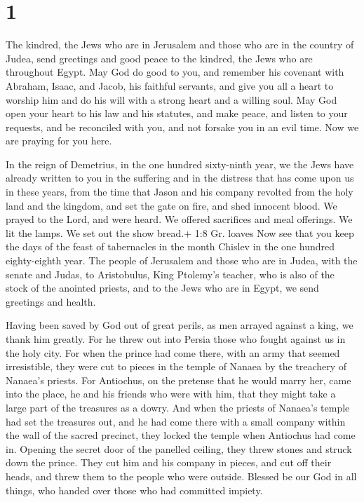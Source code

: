 \hypertarget{section}{%
\section{1}\label{section}}

 The kindred, the Jews who are in Jerusalem and those who
are in the country of Judea, send greetings and good peace to the
kindred, the Jews who are throughout Egypt.  May God do good
to you, and remember his covenant with Abraham, Isaac, and Jacob, his
faithful servants,  and give you all a heart to worship him
and do his will with a strong heart and a willing soul.  May
God open your heart to his law and his statutes, and make peace,
 and listen to your requests, and be reconciled with you,
and not forsake you in an evil time.  Now we are praying for
you here.

 In the reign of Demetrius, in the one hundred sixty-ninth
year, we the Jews have already written to you in the suffering and in
the distress that has come upon us in these years, from the time that
Jason and his company revolted from the holy land and the kingdom,
 and set the gate on fire, and shed innocent blood. We
prayed to the Lord, and were heard. We offered sacrifices and meal
offerings. We lit the lamps. We set out the show bread.+ 1:8 Gr. loaves
 Now see that you keep the days of the feast of tabernacles
in the month Chislev in the one hundred eighty-eighth year.
 The people of Jerusalem and those who are in Judea, with
the senate and Judas, to Aristobulus, King Ptolemy's teacher, who is
also of the stock of the anointed priests, and to the Jews who are in
Egypt, we send greetings and health.

 Having been saved by God out of great perils, as men
arrayed against a king, we thank him greatly.  For he threw
out into Persia those who fought against us in the holy city.
 For when the prince had come there, with an army that
seemed irresistible, they were cut to pieces in the temple of Nanaea by
the treachery of Nanaea's priests.  For Antiochus, on the
pretense that he would marry her, came into the place, he and his
friends who were with him, that they might take a large part of the
treasures as a dowry.  And when the priests of Nanaea's
temple had set the treasures out, and he had come there with a small
company within the wall of the sacred precinct, they locked the temple
when Antiochus had come in.  Opening the secret door of the
panelled ceiling, they threw stones and struck down the prince. They cut
him and his company in pieces, and cut off their heads, and threw them
to the people who were outside.  Blessed be our God in all
things, who handed over those who had committed impiety.

